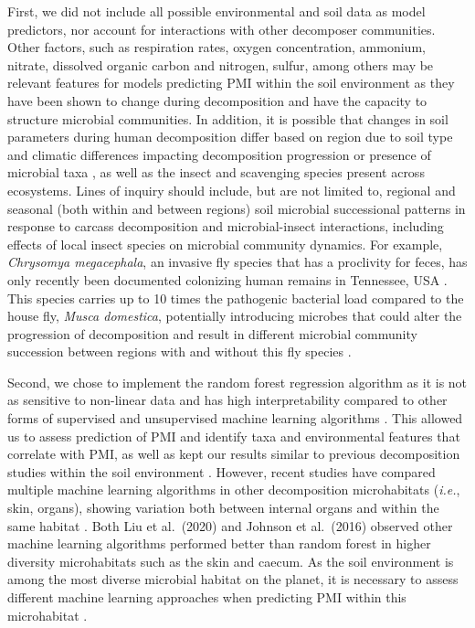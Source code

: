\documentclass[
  10pt,
  letterpaper,
]{article}
\begin{document}
First, we did not include all possible environmental and soil data as
model predictors, nor account for interactions with other decomposer
communities. Other factors, such as respiration rates, oxygen
concentration, ammonium, nitrate, dissolved organic carbon and nitrogen,
sulfur, among others may be relevant features for models predicting PMI
within the soil environment as they have been shown to change during
decomposition
\citep{cobaugh_functional_2015, metcalf_microbial_2016, mason_body_2022, debruyn_comparative_2021, aitkenhead-peterson_mapping_2012, fancher_evaluation_2017, keenan_spatial_2018, keenan_mortality_2018, quaggiotto_dynamic_2019, szelecz_soil_2018, macdonald_carrion_2014, anderson_dynamics_2013, meyer_seasonal_2013, benninger_biochemical_2008, vass_time_1992, taylor_soil_2023}
and have the capacity to structure microbial communities. In addition,
it is possible that changes in soil parameters during human
decomposition differ based on region due to soil type and climatic
differences impacting decomposition progression or presence of microbial
taxa \citep{carter_temperature_2008}, as well as the insect and
scavenging species present across ecosystems. Lines of inquiry should
include, but are not limited to, regional and seasonal (both within and
between regions) soil microbial successional patterns in response to
carcass decomposition and microbial-insect interactions, including
effects of local insect species on microbial community dynamics. For
example, \emph{Chrysomya megacephala}, an invasive fly species that has
a proclivity for feces, has only recently been documented colonizing
human remains in Tennessee, USA \citep{owings_first_2021}. This species
carries up to 10 times the pathogenic bacterial load compared to the
house fly, \emph{Musca domestica}, potentially introducing microbes that
could alter the progression of decomposition and result in different
microbial community succession between regions with and without this fly
species \citep{chaiwong_blow_2014}.

Second, we chose to implement the random forest regression algorithm as
it is not as sensitive to non-linear data and has high interpretability
compared to other forms of supervised and unsupervised machine learning
algorithms \citep{ghannam_machine_2021}. This allowed us to assess
prediction of PMI and identify taxa and environmental features that
correlate with PMI, as well as kept our results similar to previous
decomposition studies within the soil environment
\citep{belk_microbiome_2018}. However, recent studies have compared
multiple machine learning algorithms in other decomposition
microhabitats (\emph{i.e.}, skin, organs), showing variation both
between internal organs \citep{liu_predicting_2020} and within the same
habitat \citep{johnson_machine_2016}. Both Liu et al.~(2020)
\citep{liu_predicting_2020} and Johnson et al.~(2016)
\citep{johnson_machine_2016} observed other machine learning algorithms
performed better than random forest in higher diversity microhabitats
such as the skin and caecum. As the soil environment is among the most
diverse microbial habitat on the planet, it is necessary to assess
different machine learning approaches when predicting PMI within this
microhabitat \citep{metcalf_estimating_2019}.
\end{document}
